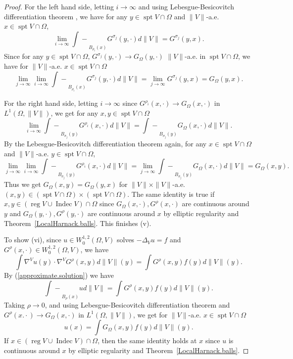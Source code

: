 \documentclass[11pt]{amsart}
\theoremstyle{definition}
\newcommand{\fint}{\mathrel{\int\!\!\!\!\!\!-}}
\DeclareMathOperator{\spt}{spt}
\DeclareMathOperator{\reg}{reg}
\DeclareMathOperator{\indec}{Indec}
\begin{document}
\begin{proof}
	For the left hand side, letting $i\to\infty$ and using Lebesgue-Besicovitch differentiation theorem \cite[Theorem 1.32]{gariepy2015measure}, we have for any $y\in \spt V\cap\Omega$ and $\|V\|$-a.e. $x\in \spt V\cap \Omega$, 
	\[
		\lim_{i\to\infty}\fint_{B_{\rho_i}(x)}G^{\sigma_j}(y,\cdot)d\|V\|=G^{\sigma_j}(y,x).
	\]  Since for any $y\in \spt V\cap \Omega$, $G^{\sigma_j}(y,\cdot)\to G_\Omega(y,\cdot)$ $\|V\|$-a.e. in $\spt V\cap \Omega$, we have for $\|V\|$-a.e. $x\in \spt V\cap \Omega$
	\[
		\lim_{j\to\infty}\lim_{i\to\infty}\fint_{B_{\rho_i}(x)}G^{\sigma_j}(y,\cdot)d\|V\|=\lim_{j\to\infty}G^{\sigma_j}(y,x)=G_\Omega(y,x).
	\]
	
	For the right hand side, letting $i\to\infty$ since $G^{\rho_i}(x,\cdot)\to G_\Omega(x,\cdot)$ in $L^1(\Omega,\|V\|)$, we get for any $x,y\in \spt V\cap \Omega$ 
	\[
		\lim_{i\to\infty}\fint_{B_{\sigma_j}(y)}G^{\rho_i}(x,\cdot)d\|V\|=\fint_{B_{\sigma_j}(y)}G_\Omega(x,\cdot)d\|V\|.
	\]
	By the Lebesgue-Besicovitch differentiation theorem \cite[Theorem 1.32]{gariepy2015measure} again, for any $x\in \spt V\cap \Omega$ and $\|V\|$-a.e. $y\in\spt V\cap \Omega$, 
	\[
		\lim_{j\to\infty}\lim_{i\to\infty}\fint_{B_{\sigma_j}(y)}G^{\rho_i}(x,\cdot)d\|V\|=\lim_{j\to\infty}\fint_{B_{\sigma_j}(y)}G_\Omega(x,\cdot)d\|V\|=G_\Omega(x,y).
	\]
	Thus we get $G_\Omega(x,y)=G_\Omega(y,x)$ for $\|V\|\times\|V\|$-a.e. $(x,y)\in (\spt V\cap \Omega)\times (\spt V\cap \Omega)$.
	The same identity is true if $x,y\in (\reg V\cup \indec V)\cap \Omega$ since $G_\Omega(x,\cdot),G^\rho(x,\cdot)$ are continuous around $y$ and $G_\Omega(y,\cdot),G^\rho(y,\cdot)$ are continuous around $x$ by elliptic regularity \cite{GT} and Theorem~\ref{LocalHarnack.balls}.
	This finishes (v).
	
	To show (vi), since $u\in W_0^{1,2}(\Omega,V)$ solves $-\Delta_Vu=f$ and $G^\rho(x,\cdot)\in W_0^{1,2}(\Omega,V)$, we have
	\[\int\nabla^V u(y)\cdot\nabla^V G^\rho(x,y)d\|V\|(y)=\int G^\rho(x,y)f(y)d\|V\|(y).\]
	By (\ref{approximate.solution}) we have
	\[\fint_{B_\rho(x)}ud\|V\|=\int G^\rho(x,y)f(y)d\|V\|(y).\]
	Taking $\rho\to0$, and using Lebesgue-Besicovitch differentiation theorem \cite[Theorem 1.32]{gariepy2015measure} and $G^\rho(x.\cdot)\to G_\Omega(x,\cdot)$ in $L^1(\Omega,\|V\|)$, we get for $\|V\|$-a.e. $x\in \spt V\cap \Omega$
	\[
	u(x)=\int G_\Omega(x,y)f(y)d\|V\|(y).
	\]
	If $x\in (\reg V\cup \indec V)\cap \Omega$, then the same identity holds at $x$ since $u$ is continuous around $x$ by elliptic regularity \cite{GT} and Theorem~\ref{LocalHarnack.balls}.
\end{proof}
\end{document}
